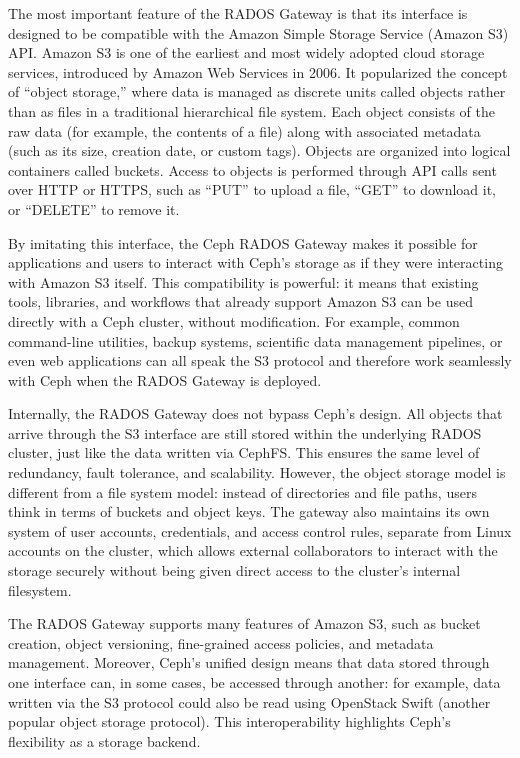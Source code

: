 The most important feature of the RADOS Gateway is that its interface is 
designed to be compatible with the Amazon Simple Storage Service (Amazon S3) 
API\parencite{Ceph_RGW_S3}. Amazon S3 is one of the earliest and most widely 
adopted cloud storage services, introduced by Amazon Web Services in 2006. It 
popularized the concept of “object storage,” where data is managed as discrete 
units called objects rather than as files in a traditional hierarchical file 
system. Each object consists of the raw data (for example, the contents of a 
file) along with associated metadata (such as its size, creation date, or custom 
tags). Objects are organized into logical containers called buckets. Access to 
objects is performed through API calls sent over HTTP or HTTPS, such as “PUT” 
to upload a file, “GET” to download it, or “DELETE” to remove it.

\medskip

By imitating this interface, the Ceph RADOS Gateway makes it possible for 
applications and users to interact with Ceph’s storage as if they were 
interacting with Amazon S3 itself\parencite{Ceph_RGW_S3,Ceph_RGW_Overview}. This 
compatibility is powerful: it means that existing tools, libraries, and 
workflows that already support Amazon S3 can be used directly with a Ceph 
cluster, without modification. For example, common command-line utilities, 
backup systems, scientific data management pipelines, or even web applications 
can all speak the S3 protocol and therefore work seamlessly with Ceph when the 
RADOS Gateway is deployed\parencite{Ceph_RGW_S3}.

\medskip

Internally, the RADOS Gateway does not bypass Ceph’s design. All objects that 
arrive through the S3 interface are still stored within the underlying RADOS 
cluster, just like the data written via CephFS\parencite{Ceph_RGW_Overview}. This 
ensures the same level of redundancy, fault tolerance, and scalability. However, 
the object storage model is different from a file system model: instead of 
directories and file paths, users think in terms of buckets and object keys. The 
gateway also maintains its own system of user accounts, credentials, and access 
control rules, separate from Linux accounts on the cluster, which allows 
external collaborators to interact with the storage securely without being given 
direct access to the cluster’s internal 
filesystem\parencite{Ceph_RGW_Overview,Ceph_RGW_S3}.

\medskip

The RADOS Gateway supports many features of Amazon S3, such as bucket creation, 
object versioning, fine-grained access policies, and metadata 
management\parencite{Ceph_RGW_S3}. Moreover, Ceph’s unified design means that 
data stored through one interface can, in some cases, be accessed through 
another: for example, data written via the S3 protocol could also be read using 
OpenStack Swift (another popular object storage 
protocol)\parencite{Ceph_RGW_Overview}. This interoperability highlights Ceph’s 
flexibility as a storage backend.

